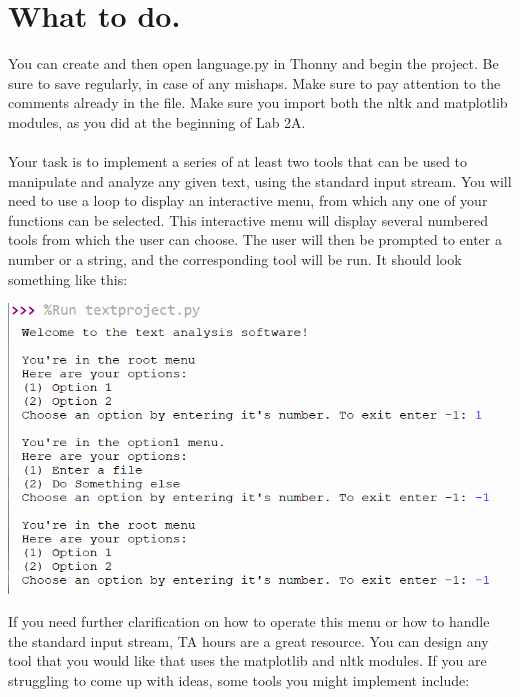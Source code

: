 \documentclass[11pt, letterpaper, onecolumn, oneside, final]{article}
\begin{document}
    \section{What to do.}  You can create and then open {\consolas language.py} in Thonny and begin the project. Be sure to save regularly, in case of any mishaps. Make sure to pay attention to the comments already in the file. Make sure you import both the {\consolas nltk} and {\consolas matplotlib} modules, as you did at the beginning of Lab 2A.\\
    \\
  Your task is to implement a series of at least two tools that can be used to manipulate and analyze any given text, using the standard input stream. You will need to use a loop to display an interactive menu, from which any one of your functions can be selected. This interactive menu will display several numbered tools from which the user can choose. The user will then be prompted to enter a number or a string, and the corresponding tool will be run. It should look something like this:
  \begin{center}
  \includegraphics[scale=.5]{textmenu2}
  \end{center}
  If you need further clarification on how to operate this menu or how to handle the standard input stream, TA hours are a great resource.
  \newpage
  You can design any tool that you would like that uses the {\consolas matplotlib} and {\consolas nltk} modules. If you are struggling to come up with ideas, some tools you might implement include:
\end{document}
